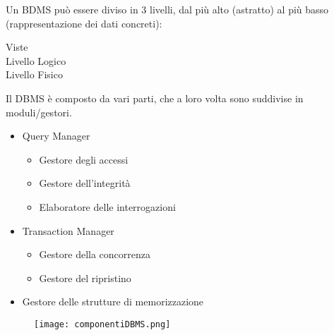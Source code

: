 Un BDMS può essere diviso in 3 livelli, dal più alto (astratto) al più basso (rappresentazione dei dati concreti):
\begin{center}
    Viste\\
    Livello Logico\\
    Livello Fisico
\end{center}
Il DBMS \`e composto da vari parti, che a loro volta sono suddivise in moduli/gestori.
\begin{itemize}
    \item Query Manager
    \begin{itemize}
        \item Gestore degli accessi
        \item Gestore dell'integrità
        \item Elaboratore delle interrogazioni
    \end{itemize}
    
    \item Transaction Manager
    \begin{itemize}
        \item Gestore della concorrenza
        \item Gestore del ripristino
    \end{itemize}
    
    \item Gestore delle strutture di memorizzazione
\end{itemize}

\begin{figure}[h]
    \centering
    \texttt{[image: componentiDBMS.png]}
    \label{fig:componentiDBMS}
\end{figure}